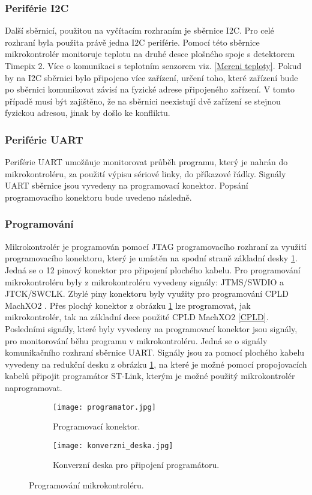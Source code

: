  	\subsubsection{Periférie I2C}
 	Další sběrnicí, použitou na vyčítacím rozhraním je sběrnice I2C. Pro celé rozhraní byla použita právě jedna I2C periférie. Pomocí této sběrnice mikrokontrolér monitoruje teplotu na druhé desce plošného spoje s detektorem Timepix 2. Více o komunikaci s teplotním senzorem viz. \ref{Mereni teploty}. Pokud by na I2C sběrnici bylo připojeno více zařízení, určení toho, které zařízení bude po sběrnici komunikovat závisí na fyzické adrese připojeného zařízení. V tomto případě musí být zajištěno, že na sběrnici neexistují dvě zařízení se stejnou fyzickou adresou, jinak by došlo ke konfliktu. 
 	
 	\subsubsection{Periférie UART}
 	\par Periférie UART umožňuje monitorovat průběh programu, který je nahrán do mikrokontroléru, za použití výpisu sériové linky, do příkazové řádky. Signály UART sběrnice jsou vyvedeny na programovací konektor. Popsání programovacího konektoru bude uvedeno následně.

	\subsubsection{Programování}
	Mikrokontrolér je programován pomocí JTAG programovacího rozhraní za využití programovacího konektoru, který je umístěn na spodní straně základní desky \ref{fig:programator}. Jedná se o 12 pinový konektor pro připojení plochého kabelu. Pro programování mikrokontroléru byly z mikrokontroléru vyvedeny signály: JTMS/SWDIO a JTCK/SWCLK. Zbylé piny konektoru byly využity pro programování CPLD MachXO2 \cite{CPLD}. Přes plochý konektor z obrázku \ref{fig:programator} lze programovat, jak mikrokontrolér, tak na základní dece použité CPLD MachXO2 \ref{CPLD}. Posledními signály, které byly vyvedeny na programovací konektor jsou signály, pro monitorování běhu programu v mikrokontroléru. Jedná se o signály komunikačního rozhraní sběrnice UART. Signály jsou za pomocí plochého kabelu vyvedeny na redukční desku z obrázku \ref{fig:programator}, na které je možné pomocí propojovacích kabelů připojit programátor ST-Link, kterým je možné použitý mikrokontrolér naprogramovat. 
\begin{figure}[h!]
	\begin{subfigure}{0.5\textwidth}
		\centering
		\captionsetup{justification=centering}
		\texttt{[image: programator.jpg]}
		\caption{Programovací konektor.} 
		\label{fig:programator}
	\end{subfigure}
	\begin{subfigure}{0.5\textwidth}
		\centering
		\captionsetup{justification=centering}
		\texttt{[image: konverzni\_deska.jpg]}
		\caption{Konverzní deska pro připojení programátoru.} 
		\label{fig:konverzni_deska}
	\end{subfigure}
	\caption{Programování mikrokontroléru.}
	\label{fig:programovani}
\end{figure} 


